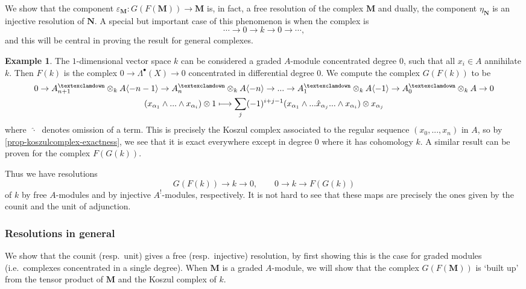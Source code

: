 \documentclass[a4paper]{article}
\theoremstyle{definition}
\newtheorem{example}[defn]{Example}
\theoremstyle{remark}
\newcommand{\gnab}{{\textexclamdown}}
\begin{document}
We show that the component \(\varepsilon_\mathbf{M}:G(F(\mathbf{M}))\rightarrow
\mathbf{M}\) is, in fact, a free resolution of the complex \(\mathbf{M}\) and
dually, the component \(\eta_\mathbf{N}\) is an injective resolution of
\(\mathbf{N}\). A special but important case of this phenomenon is when the
complex is \[\cdots \rightarrow 0\longrightarrow k\longrightarrow 0\rightarrow
\cdots,\] and this will be central in proving the result for general complexes.

\begin{example}\label{GFk->k} 
    The \(1\)-dimensional vector space \(k\) can be considered a graded
    \(A\)-module concentrated degree \(0\), such that all \(x_i\in A\)
    annihilate \(k\). Then \(F(k)\) is the complex \(0\rightarrow
    \Lambda^\bullet(X) \rightarrow 0\) concentrated in differential degree
    \(0\). We compute the complex \(G(F(k))\) to be 
    \begin{gather} 
        0\rightarrow A^\gnab_{n+1}\otimes_k A\langle-n-1\rangle \rightarrow
        A^\gnab_n \otimes_k A\langle -n \rangle \rightarrow ... \rightarrow
        A^\gnab_1\otimes_k A\langle-1\rangle \rightarrow A^\gnab_0\otimes_k  A
        \rightarrow 0 \label{k-koszulcomplex} \\ (x_{\alpha_1}\wedge...\wedge
        x_{\alpha_i})\otimes 1 \longmapsto \sum_{j}(-1)^{i+j-1}
        (x_{\alpha_1}\wedge ... \hat{x}_{\alpha_j} ... \wedge x_{\alpha_i})
        \otimes x_{\alpha_j} \nonumber 
    \end{gather} 
    where \(\;\hat{\cdot}\;\) denotes omission of a term. This is precisely the
    Koszul complex associated to the regular sequence \((x_0,...,x_n)\) in
    \(A\), so by \cref{prop-koszulcomplex-exactness}, we see that it is exact
    everywhere except in degree \(0\) where it has cohomology \(k\). A similar
    result can be proven for the complex \(F(G(k))\).

    Thus we have resolutions  \[G(F(k))\rightarrow k\rightarrow 0, \qquad
    0\rightarrow k\rightarrow F(G(k))\] of \(k\) by free \(A\)-modules and by
    injective \(A^!\)-modules, respectively.  It is not hard to see that these
    maps are precisely the ones given by the counit and the unit of adjunction.
\end{example}

\subsubsection{Resolutions in general} 
We show that the counit (resp.\ unit) gives a free (resp.\ injective)
resolution, by first showing this is the case for graded modules (i.e.\
complexes concentrated in a single degree). When \(\mathbf{M}\) is a graded
\(A\)-module, we will show that the complex \(G(F(\mathbf{M}))\) is `built up'
from the tensor product of \(\mathbf{M}\) and the Koszul complex of \(k\). 
\end{document}
